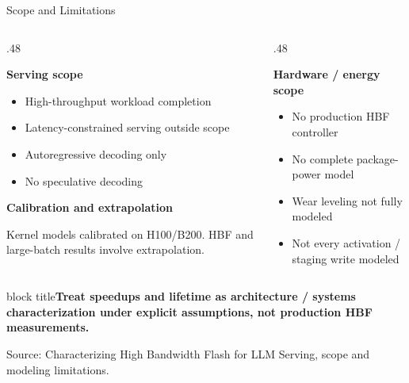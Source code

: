 \documentclass[aspectratio=169,10pt]{beamer}
\newcommand{\takeaway}[1]{\par\vspace{.12cm}\begin{beamercolorbox}[rounded=true,sep=.12cm,wd=\linewidth]{block title}\small\bfseries #1\end{beamercolorbox}}
\newcommand{\src}[1]{\par\vfill{\fontsize{7}{8}\selectfont\color{Muted}Source: Characterizing High Bandwidth Flash for LLM Serving, #1.}\par}
\newcommand{\head}[1]{\par{\color{Accent}\bfseries #1}\par\smallskip}
\begin{document}
\begin{frame}[t]{Scope and Limitations}

\begin{columns}[T,onlytextwidth]
\begin{column}{.48\textwidth}
\head{Serving scope}
\begin{itemize}
\item High-throughput workload completion
\item Latency-constrained serving outside scope
\item Autoregressive decoding only
\item No speculative decoding
\end{itemize}
\vspace{.1cm}\head{Calibration and extrapolation}
Kernel models calibrated on H100/B200. HBF and large-batch results involve extrapolation.
\end{column}
\begin{column}{.48\textwidth}
\head{Hardware / energy scope}
\begin{itemize}
\item No production HBF controller
\item No complete package-power model
\item Wear leveling not fully modeled
\item Not every activation / staging write modeled
\end{itemize}
\end{column}
\end{columns}
\takeaway{Treat speedups and lifetime as architecture / systems characterization under explicit assumptions, not production HBF measurements.}

\src{scope and modeling limitations}
\end{frame}
\end{document}
